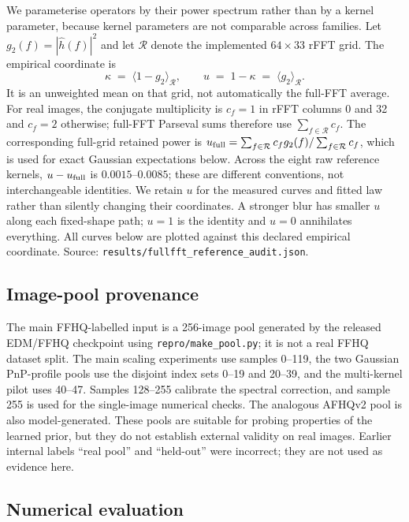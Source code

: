 \documentclass[10pt,journal]{IEEEtran}
\newcommand{\kunif}{\kappa}
\begin{document}
We parameterise operators by their power spectrum rather than by a kernel parameter, because
kernel parameters are not comparable across families. Let $g_2(f)=|\hat h(f)|^2$ and let
$\mathcal R$ denote the implemented $64\times33$ rFFT grid. The empirical coordinate is
\begin{equation}
  \kunif \;=\; \big\langle 1-g_2\big\rangle_{\mathcal R}, \qquad
  u \;=\; 1-\kunif \;=\; \big\langle g_2\big\rangle_{\mathcal R}.
  \label{eq:kunif}
\end{equation}
It is an unweighted mean on that grid, not automatically the full-FFT average. For real images,
the conjugate multiplicity is $c_f=1$ in rFFT columns 0 and 32 and $c_f=2$ otherwise; full-FFT
Parseval sums therefore use $\sum_{f\in\mathcal R}c_f$. The corresponding full-grid retained
power is $u_{\rm full}=\sum_{f\in\mathcal R}c_f g_2(f)/\sum_{f\in\mathcal R}c_f$, which is used
for exact Gaussian expectations below. Across the eight raw reference kernels, $u-u_{\rm full}$
is $0.0015$--$0.0085$; these are different conventions, not interchangeable identities. We
retain $u$ for the measured curves and fitted law rather than silently changing their coordinates.
A stronger blur has smaller $u$ along each fixed-shape path; $u=1$ is the identity and $u=0$
annihilates everything. All curves below are plotted against this declared empirical coordinate.
Source: \texttt{results/fullfft\_reference\_audit.json}.

\subsection{Image-pool provenance}
\label{sec:pools}

The main FFHQ-labelled input is a 256-image pool generated by the released EDM/FFHQ checkpoint
using \texttt{repro/make\_pool.py}; it is not a real FFHQ dataset split. The main scaling
experiments use samples 0--119, the two Gaussian PnP-profile pools use the disjoint index sets
0--19 and 20--39, and the multi-kernel pilot uses 40--47. Samples 128--255 calibrate the spectral
correction, and sample 255 is used for the single-image numerical checks. The analogous AFHQv2
pool is also model-generated. These pools are suitable for probing properties of the learned
prior, but they do not establish external validity on real images. Earlier internal labels
``real pool'' and ``held-out'' were incorrect; they are not used as evidence here.

\subsection{Numerical evaluation}
\end{document}

